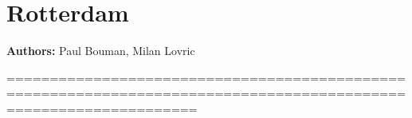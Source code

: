 \section{Rotterdam}
\label{sec:rotterdam}
\hfill \textbf{Authors:} Paul Bouman, Milan Lovric

 ==================================================================================================================
